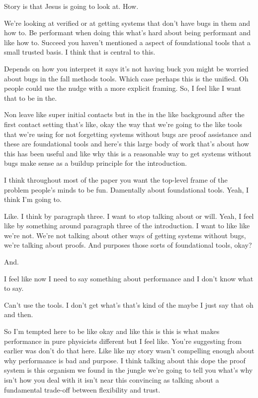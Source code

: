 \begin{subappendices}
Story is that Jesus is going to look at. How. 

We're looking at verified or at getting systems that don't have bugs in them and how to. Be performant when doing this what's hard about being performant and like how to. Succeed you haven't mentioned a aspect of foundational tools that a small trusted basis. I think that is central to this. 

Depends on how you interpret it says it's not having buck you might be worried about bugs in the fall methods tools. Which case perhaps this is the unified. Oh people could use the nudge with a more explicit framing. So, I feel like I want that to be in the. 

Non leave like super initial contacts but in the in the like background after the first contact setting that's like, okay the way that we're going to the like tools that we're using for not forgetting systems without bugs are proof assistance and these are foundational tools and here's this large body of work that's about how this has been useful and like why this is a reasonable way to get systems without bugs make sense as a buildup principle for the introduction. 

I think throughout most of the paper you want the top-level frame of the problem people's minds to be fun. Damentally about foundational tools. Yeah, I think I'm going to. 

Like. I think by paragraph three. I want to stop talking about or will. Yeah, I feel like by something around paragraph three of the introduction. I want to like like we're not. We're not talking about other ways of getting systems without bugs, we're talking about proofs. And purposes those sorts of foundational tools, okay? 

And. 

I feel like now I need to say something about performance and I don't know what to say. 

Can't use the tools. I don't get what's that's kind of the maybe I just say that oh and then. 

So I'm tempted here to be like okay and like this is this is what makes performance in pure physicists different but I feel like. You're suggesting from earlier was don't do that here. Like like my story wasn't compelling enough about why performance is bad and purpose. I think talking about this dope the proof system is this organism we found in the jungle we're going to tell you what's why isn't how you deal with it isn't near this convincing as talking about a fundamental trade-off between flexibility and trust. 


\end{subappendices}
